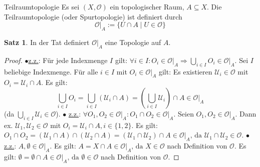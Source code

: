 \documentclass[a4paper,11pt,notitlepage]{report}
\theoremstyle{definition}
\newtheorem{theorem}{Satz}[chapter]
\newcommand{\OO}{{\ensuremath{\mathcal{O}}}}
\begin{document}
\begin{section}{Teilraumtopologie}
	Es sei $(X, \OO)$ ein topologischer Raum, $A \subseteq X$.
	\newline
	Die Teilraumtopologie (oder Spurtopologie) ist definiert durch
	$$\OO \big |_{A} := \{U \cap A \mid U \in \OO\} $$
	
	\begin{theorem}
		In der Tat definiert $\OO \big |_{A}$ eine Topologie auf $A$.
	\end{theorem}
	
	\begin{proof}
			$\bullet$\underline{z.z.}: Für jede Indexmenge $I$ gilt:
				$\forall i \in I \colon O_i \in \OO \big |_{A} \Rightarrow \bigcup\limits_{i \in I}{O_i} \in \OO \big |_{A}.$
			\newline
			Sei $I$ beliebige Indexmenge. Für alle $i \in I$ mit $O_i \in \OO \big |_{A}$ gilt:
			Es existieren $\mathcal{U}_i \in \OO$ mit $O_i= \mathcal{U}_i \cap A$.
			Es gilt:
			$$\bigcup\limits_{i \in I}{O_i} = \bigcup\limits_{i \in I}{(\mathcal{U}_i \cap A) } = (\bigcup\limits_{i \in I}{\mathcal{U}_i})\cap A \in \OO \big |_{A}$$ (da $\bigcup\limits_{i \in I}{\mathcal{U}_i} \in \OO$).
			\newline
			$\bullet$ \underline{z.z.}: $\forall O_1, O_2 \in \OO \big |_{A} \colon O_1 \cap O_2 \in \OO \big |_{A}.$
			\newline
			Seien $O_1, O_2 \in \OO \big |_{A}$. Dann ex. $\mathcal{U}_1, \mathcal{U}_2 \in \OO$ mit $O_i = \mathcal{U}_i \cap A, i \in \{1,2\}.$ Es gilt:
			$O_1 \cap O_2 = (\mathcal{U}_1 \cap A) \cap (\mathcal{U}_2 \cap A) = (\mathcal{U}_1 \cap \mathcal{U}_2) \cap A \in \OO \big |_{A} \text{, da } \mathcal{U}_1 \cap \mathcal{U}_2 \in \OO.$
			\newline
			$\bullet$ \underline{z.z.}: $A, \emptyset \in \OO \big |_{A}.$
			\newline
			Es gilt: $A = X \cap A \in \OO \big |_{A}\text{, da } X \in \OO$ nach Definition von $\OO$. 
			\newline
			Es gilt: $\emptyset = \emptyset \cap A \in \OO \big |_{A} \text{, da } \emptyset \in \OO$ nach Definition von $\OO$.
	\end{proof}
\end{section}
\end{document}
